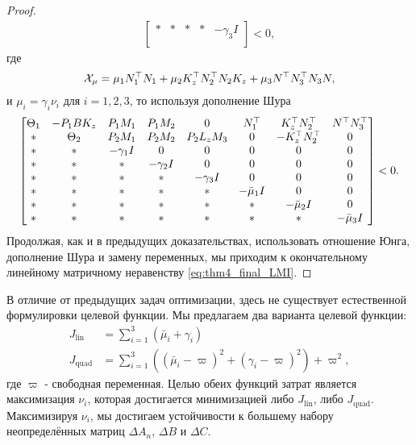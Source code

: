 \begin{proof}
\begin{multline}
\begin{bmatrix}
			*&*&*&*&-\gamma_3{I}\\
		\end{bmatrix} 
		<0,
	\end{multline}
	где
	\begin{equation}
		\mathcal{X}_{\mu}=\mu_1{N}_1^\top{N}_1 +\mu_2{K}_z^\top{N}_2^\top{N}_2{K}_z+\mu_3{N}^\top{N}_3^\top{N}_3{N},
	\end{equation}
	и $\mu_i=\gamma_i\nu_i$ для $i=1,2,3$, то используя дополнение Шура
	\begin{equation}
		\label{eq:thm4_after_Schur}
		\begin{bmatrix}
			{\Theta}_1 & -{P}_1{B}{K}_z & {P}_1{M}_1 & {P}_1{M}_2 & 0 & {N}_1^\top & {K}_z^\top{N}_2^\top & {N}^\top{N}_3^\top 
			\\
			* & {\Theta}_2 & {P}_2{M}_1 & {P}_2{M}_2 & {P}_2{L}_z{M}_3&0& -{K}_z^\top{N}_2^\top& 0\\
			* & * & -\gamma_1{I} & 0&0&0&0&0\\
			* & * & * & -\gamma_2{I}&0&0&0&0\\
			* & * & * & *&-\gamma_3{I}&0&0&0\\
			* & * & * & *&*&-\bar{\mu}_1{I}&0&0\\
			* & * & * & *&*&*&-\bar{\mu}_2{I}&0\\
			*&* & * & * & *&*&*&-\bar{\mu}_3{I}\\
		\end{bmatrix}<0.
	\end{equation}
	Продолжая, как и в предыдущих доказательствах, использовать отношение Юнга, дополнение Шура и замену переменных, мы приходим к окончательному линейному матричному неравенству \eqref{eq:thm4_final_LMI}.
\end{proof}
В отличие от предыдущих задач оптимизации, здесь не существует естественной формулировки целевой функции. Мы предлагаем два варианта целевой функции:
\begin{align}
	\label{eq:cost_lin}
	J_\text{lin} &= \sum_{i=1}^{3}\left(\bar{\mu}_i+\gamma_i\right) \\ 
	\label{eq:cost_quad}
	J_\text{quad} & =  \sum_{i=1}^{3}\left((\bar{\mu}_i-\varpi)^2+(\gamma_i-\varpi)^2\right) + \varpi^2,
\end{align}
%
где $\varpi$ - свободная переменная. Целью обеих функций затрат является максимизация $\nu_i$, которая достигается минимизацией либо $J_\text{lin}$, либо $J_\text{quad}$. Максимизируя $\nu_i$, мы достигаем устойчивости к большему набору неопределённых матриц $\Delta {A}_n$, $\Delta {B}$ и $\Delta {C}$.

